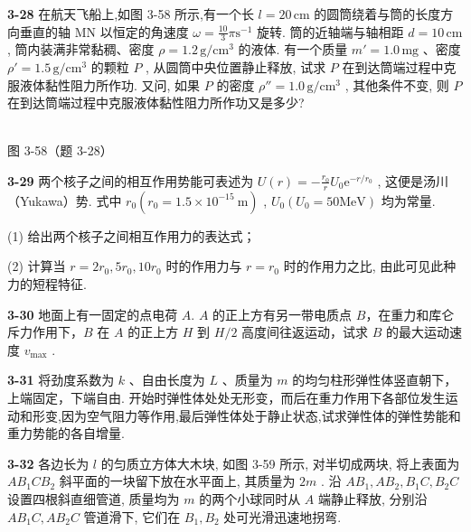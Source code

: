 \newpage

\textbf{3-28} 在航天飞船上,如图 3-58 所示,有一个长 $l=20\,\mathrm{cm}$ 的圆筒绕着与筒的长度方向垂直的轴 MN 以恒定的角速度 $\omega = \frac{10}{3}\pi \mathrm{s}^{-1}$ 旋转. 筒的近轴端与轴相距 $d = 10\,\mathrm{cm}$ , 筒内装满非常黏稠、密度 $\rho = 1.2\,\mathrm{g/cm^3}$ 的液体. 有一个质量 $m' = 1.0\,\mathrm{mg}$ 、密度 $\rho' = 1.5\,\mathrm{g/cm^3}$ 的颗粒 $P$ , 从圆筒中央位置静止释放, 试求 $P$ 在到达筒端过程中克服液体黏性阻力所作功. 又问, 如果 $P$ 的密度 $\rho'' = 1.0\,\mathrm{g/cm^3}$ , 其他条件不变, 则 $P$ 在到达筒端过程中克服液体黏性阻力所作功又是多少?

\begin{center}
\resizebox{0.50\textwidth}{!}{}\\[4pt]
{\small 图 3-58（题 3-28）}
\end{center}

\newpage

\textbf{3-29} 两个核子之间的相互作用势能可表述为 $U(r) = -\frac{r_0}{r} U_0 \mathrm{e}^{-r / r_0}$ , 这便是汤川（Yukawa）势. 式中 $r_0 (r_0 = 1.5 \times 10^{-15} \mathrm{~m})$ , $U_0 (U_0 = 50 \mathrm{MeV})$ 均为常量.

(1) 给出两个核子之间相互作用力的表达式；

(2) 计算当 $r=2r_{0},5r_{0},10r_{0}$ 时的作用力与 $r=r_{0}$ 时的作用力之比, 由此可见此种力的短程特征.

\newpage

\textbf{3-30} 地面上有一固定的点电荷 $A$. $A$ 的正上方有另一带电质点 $B$，在重力和库仑斥力作用下，$B$ 在 $A$ 的正上方 $H$ 到 $H/2$ 高度间往返运动，试求 $B$ 的最大运动速度 $v_{\max}$ .

\newpage

\textbf{3-31} 将劲度系数为 $k$ 、自由长度为 $L$ 、质量为 $m$ 的均匀柱形弹性体竖直朝下，上端固定，下端自由. 开始时弹性体处处无形变，而后在重力作用下各部位发生运动和形变,因为空气阻力等作用,最后弹性体处于静止状态,试求弹性体的弹性势能和重力势能的各自增量.

\newpage

\textbf{3-32} 各边长为 $l$ 的匀质立方体大木块, 如图 3-59 所示, 对半切成两块, 将上表面为 $AB_{1}CB_{2}$ 斜平面的一块留下放在水平面上, 其质量为 $2m$ . 沿 $AB_{1}, AB_{2}, B_{1}C, B_{2}C$ 设置四根斜直细管道, 质量均为 $m$ 的两个小球同时从 $A$ 端静止释放, 分别沿 $AB_{1}C, AB_{2}C$ 管道滑下, 它们在 $B_{1}, B_{2}$ 处可光滑迅速地拐弯.

